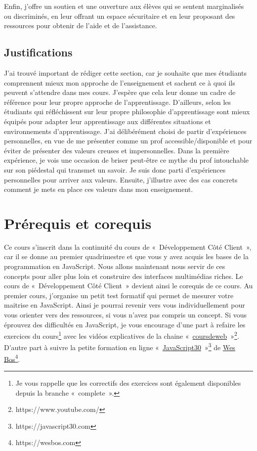 Enfin, j'offre un soutien et une ouverture aux élèves qui se sentent marginalisés ou discriminés, en leur offrant un espace sécuritaire et en leur proposant des ressources pour obtenir de l'aide et de l'assistance.

\subsection{Justifications}

J’ai trouvé important de rédiger cette section, car je souhaite que mes étudiants comprennent mieux mon approche de l'enseignement et sachent ce à quoi ils peuvent s'attendre dans mes cours. J'espère que cela leur donne un cadre de référence pour leur propre approche de l'apprentissage. D’ailleurs, selon \citet{barkley2014collaborative} les étudiants qui réfléchissent sur leur propre philosophie d'apprentissage sont mieux équipés pour adapter leur apprentissage aux différentes situations et environnements d'apprentissage.
J'ai délibérément choisi de partir d'expériences personnelles, en vue de me présenter comme un prof accessible/disponible et pour éviter de présenter des valeurs creuses et impersonnelles. Dans la première expérience, je vois une occasion de briser peut-être ce mythe du prof intouchable sur son piédestal qui transmet un savoir. Je suis donc parti d'expériences personnelles pour arriver aux valeurs. Ensuite, j'illustre avec des cas concrets comment je mets en place ces valeurs dans mon enseignement.

\clearpage
\section{Prérequis et corequis}

Ce cours s’inscrit dans la continuité du cours de «~Développement Côté Client~», car il se donne au premier quadrimestre et que vous y avez acquis les bases de la programmation en JavaScript. Nous allons maintenant nous servir de ces concepts pour aller plus loin et construire des interfaces multimédias riches. Le cours de «~Développement Côté Client~» devient ainsi le corequis de ce cours.
Au premier cours, j'organise un petit test formatif qui permet de mesurer votre maitrise en JavaScript. Ainsi je pourrai revenir vers vous individuellement pour vous orienter vers des ressources, si vous n’avez pas compris un concept. Si vous éprouvez des difficultés en JavaScript, je vous encourage d’une part à refaire les exercices du cours\footnote{Je vous rappelle que les correctifs des exercices sont également disponibles depuis la branche «~complete~».} avec les vidéos explicatives de la chaine «~\href{https://www.youtube.com/@coursdeweb}{coursdeweb}~»\footnote{https://www.youtube.com/\@coursdeweb}. D’autre part à suivre la petite formation en ligne «~\href{https://javascript30.com}{JavaScript30}~»\footnote{https://javascript30.com} de \href{https://wesbos.com}{Wes Bos}\footnote{https://wesbos.com}.

